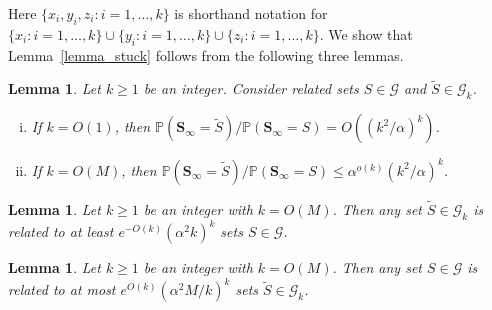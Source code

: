 \documentclass{article}
\theoremstyle{plain}
\theoremstyle{remark}
\theoremstyle{plain}
\newtheorem{lemma}[theorem]{Lemma}
\numberwithin{equation}{section}
\begin{document}
	Here $\{x_i,y_i,z_i:i=1,\ldots,k\}$ is shorthand notation for $\{x_i:i=1,\ldots,k\}\cup\{y_i:i=1,\ldots,k\}\cup\{z_i:i=1,\ldots,k\}$. We show that Lemma~\ref{lemma_stuck} follows from the following three lemmas.
	
	\begin{lemma}\label{lemma_ratio}
		Let $k\geq1$ be an integer. Consider related sets $S\in\mathcal{G}$ and $\widetilde{S}\in\mathcal{G}_k$.
		\begin{enumerate}[(i)]
			\item\label{lemma_ratio_small} If $k=O(1)$, then $\mathbb{P}(\boldsymbol{S}_{\infty}=\widetilde{S})/\mathbb{P}(\boldsymbol{S}_{\infty}=S)=O((k^2/\alpha)^k)$.
			\item\label{lemma_ratio_large} If $k=O(M)$, then $\mathbb{P}(\boldsymbol{S}_{\infty}=\widetilde{S})/\mathbb{P}(\boldsymbol{S}_{\infty}=S)\leq\alpha^{o(k)}(k^2/\alpha)^k$.
		\end{enumerate}
	\end{lemma}
	
	\begin{lemma}\label{lemma_related_good}
		Let $k\geq1$ be an integer with $k=O(M)$. Then any set $\widetilde{S}\in\mathcal{G}_k$ is related to at least $e^{-O(k)}(\alpha^2k)^k$ sets $S\in\mathcal{G}$.
	\end{lemma}
	
	\begin{lemma}\label{lemma_related_bad}
		Let $k\geq1$ be an integer with $k=O(M)$. Then any set $S\in\mathcal{G}$ is related to at most $e^{O(k)}(\alpha^2M/k)^k$ sets $\widetilde{S}\in\mathcal{G}_k$.
	\end{lemma}
	
\end{document}
